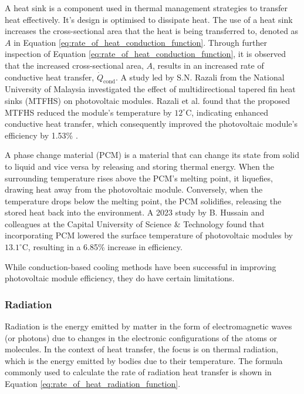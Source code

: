 A heat sink is a component used in thermal management strategies to transfer heat effectively. It's design is optimised to dissipate heat. \cite{Kumar2024QualitativeReview} The use of a heat sink increases the cross-sectional area that the heat is being transferred to, denoted as $A$ in Equation \ref{eq:rate_of_heat_conduction_function}. Through further inspection of Equation \ref{eq:rate_of_heat_conduction_function}, it is observed that the increased cross-sectional area, $A$, results in an increased rate of conductive heat transfer, $\dot{Q}_\text{cond}$. A study led by S.N. Razali from the National University of Malaysia investigated the effect of multidirectional tapered fin heat sinks (MTFHS) on photovoltaic modules. Razali et al. found that the proposed MTFHS reduced the module's temperature by $12^\circ \text{C}$, indicating enhanced conductive heat transfer, which consequently improved the photovoltaic module's efficiency by 1.53\% \cite{Razali2023PerformanceMTFHS}.\vspace{0.5em}

A phase change material (PCM) is a material that can change its state from solid to liquid and vice versa by releasing and storing thermal energy. \cite{Nicholas2019ActivatedMaterial} When the surrounding temperature rises above the PCM’s melting point, it liquefies, drawing heat away from the photovoltaic module. Conversely, when the temperature drops below the melting point, the PCM solidifies, releasing the stored heat back into the environment. A 2023 study by B. Hussain and colleagues at the Capital University of Science \& Technology found that incorporating PCM lowered the surface temperature of photovoltaic modules by $13.1^\circ \text{C}$, resulting in a 6.85\% increase in efficiency. \cite{Hussain2023Phase}\vspace{0.5em}

While conduction-based cooling methods have been successful in improving photovoltaic module efficiency, they do have certain limitations.\par
\par

\subsubsection{Radiation}
Radiation is the energy emitted by matter in the form of electromagnetic waves (or photons) due to changes in the electronic configurations of the atoms or molecules. In the context of heat transfer, the focus is on thermal radiation, which is the energy emitted by bodies due to their temperature. The formula commonly used to calculate the rate of radiation heat transfer is shown in Equation \ref{eq:rate_of_heat_radiation_function}. \cite{Cengel2014IntroductionConcepts}

